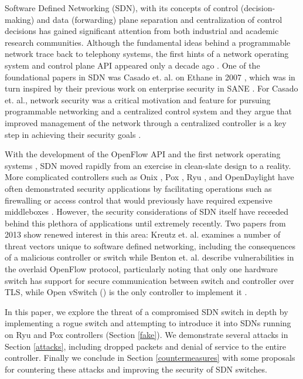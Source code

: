 Software Defined Networking (SDN), with its concepts of control (decision-making) and data (forwarding) plane separation and centralization of control decisions has gained significant attention from both industrial and academic research communities.  Although the fundamental ideas behind a programmable network trace back to telephony systems, the first hints of a network operating system and control plane API appeared only a decade ago \cite{history}.  One of the foundational papers in SDN was Casado et. al. on Ethane in 2007 \cite{ethane}, which was in turn inspired by their previous work on enterprise security in SANE \cite{sane}.  For Casado et. al., network security was a critical motivation and feature for pursuing programmable networking and a centralized control system and they argue that improved management of the network through a centralized controller is a key step in achieving their security goals \cite{ethane}.

With the development of the OpenFlow API and the first network operating systems \cite{openflow}\cite{nox}, SDN moved rapidly from an exercise in clean-slate design to a reality.  More complicated controllers such as Onix \cite{onix}, Pox \cite{pox}, Ryu \cite{ryu}, and OpenDaylight\cite{opendaylight} have often demonstrated security applications by facilitating operations such as firewalling or access control that would previously have required expensive middleboxes \cite{resonance}.  However, the security considerations of SDN itself have receeded behind this plethora of applications until extremely recently.  Two papers from 2013 show renewed interest in this area: Kreutz et. al. examines a number of threat vectors unique to software defined networking, including the consequences of a malicious controller or switch \cite{sdnsec} while Benton et. al. describe vulnerabilities in the overlaid OpenFlow protocol, particularly noting that only one hardware switch has support for secure communication between switch and controller over TLS, while Open vSwitch (\cite{openvswitch}) is the only controller to implement it \cite{benton}.

In this paper, we explore the threat of a compromised SDN switch in depth by implementing a rogue switch and attempting to introduce it into SDNs running on Ryu and Pox controllers (Section \ref{fake}).  We demonstrate several attacks in Section \ref{attacks}, including dropped packets and denial of service to the entire controller.  Finally we conclude in Section \ref{countermeasures} with some proposals for countering these attacks and improving the security of SDN switches.


